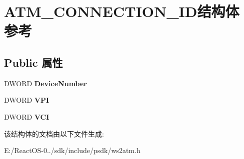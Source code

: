 \hypertarget{struct_a_t_m___c_o_n_n_e_c_t_i_o_n___i_d}{}\section{A\+T\+M\+\_\+\+C\+O\+N\+N\+E\+C\+T\+I\+O\+N\+\_\+\+I\+D结构体 参考}
\label{struct_a_t_m___c_o_n_n_e_c_t_i_o_n___i_d}
\subsection*{Public 属性}
\begin{DoxyCompactItemize}
\item 
\mbox{\label{struct_a_t_m___c_o_n_n_e_c_t_i_o_n___i_d_ac4b9a502c80cf79d2a3c310bea59a19f}} 
D\+W\+O\+RD {\bfseries Device\+Number}
\item 
\mbox{\label{struct_a_t_m___c_o_n_n_e_c_t_i_o_n___i_d_ae61679e44074d13e86f854280c942f72}} 
D\+W\+O\+RD {\bfseries V\+PI}
\item 
\mbox{\label{struct_a_t_m___c_o_n_n_e_c_t_i_o_n___i_d_ad4b372c18efbd0e57e8cebc6d768c6b1}} 
D\+W\+O\+RD {\bfseries V\+CI}
\end{DoxyCompactItemize}


该结构体的文档由以下文件生成\+:\begin{DoxyCompactItemize}
\item 
E\+:/\+React\+O\+S-\/0../sdk/include/psdk/ws2atm.\+h\end{DoxyCompactItemize}
